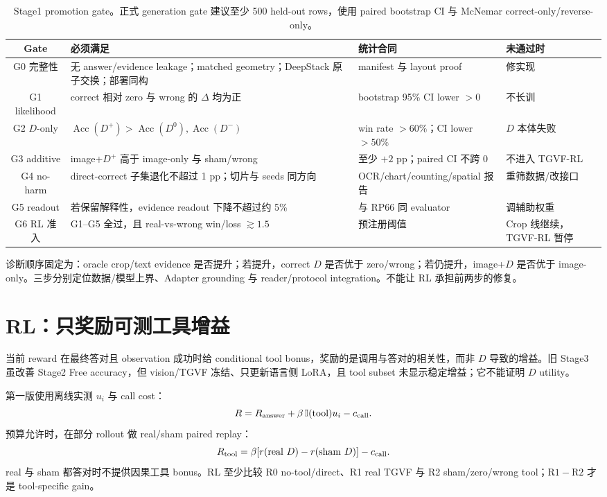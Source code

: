 \documentclass[UTF8,twocolumn,10pt,a4paper]{ctexart}
\begin{document}
\begin{table}[t]
\centering
\caption{Stage1 promotion gate。正式 generation gate 建议至少 500 held-out rows，使用 paired bootstrap CI 与 McNemar correct-only/reverse-only。}
\label{tab:promotion}
\small
\begin{tabularx}{0.97\textwidth}{cYYl}
\toprule
Gate & 必须满足 & 统计合同 & 未通过时 \\
\midrule
G0 完整性 & 无 answer/evidence leakage；matched geometry；DeepStack 原子交换；部署同构 & manifest 与 layout proof & 修实现 \\
G1 likelihood & correct 相对 zero 与 wrong 的 $\Delta$ 均为正 & bootstrap 95\% CI lower $>0$ & 不长训 \\
G2 $D$-only & $\operatorname{Acc}(D^+)>\operatorname{Acc}(D^0),\operatorname{Acc}(D^-)$ & win rate $>60\%$；CI lower $>50\%$ & $D$ 本体失败 \\
G3 additive & image+$D^+$ 高于 image-only 与 sham/wrong & 至少 $+2$ pp；paired CI 不跨 0 & 不进入 TGVF-RL \\
G4 no-harm & direct-correct 子集退化不超过 1 pp；切片与 seeds 同方向 & OCR/chart/counting/spatial 报告 & 重筛数据/改接口 \\
G5 readout & 若保留解释性，evidence readout 下降不超过约 5\% & 与 RP66 同 evaluator & 调辅助权重 \\
G6 RL 准入 & G1--G5 全过，且 real-vs-wrong win/loss $\gtrsim1.5$ & 预注册阈值 & Crop 线继续，TGVF-RL 暂停 \\
\bottomrule
\end{tabularx}
\end{table}

诊断顺序固定为：oracle crop/text evidence 是否提升；若提升，correct $D$ 是否优于 zero/wrong；若仍提升，image+$D$ 是否优于 image-only。三步分别定位数据/模型上界、Adapter grounding 与 reader/protocol integration。不能让 RL 承担前两步的修复。

\section{RL：只奖励可测工具增益}

当前 reward 在最终答对且 observation 成功时给 conditional tool bonus，奖励的是调用与答对的相关性，而非 $D$ 导致的增益。旧 Stage3 虽改善 Stage2 Free accuracy，但 vision/TGVF 冻结、只更新语言侧 LoRA，且 tool subset 未显示稳定增益；它不能证明 $D$ utility。

第一版使用离线实测 $u_i$ 与 call cost：
\begin{equation}
 R=R_{\rm answer}+\beta\,\mathbb I(\mathrm{tool})u_i-c_{\rm call}.
 \label{eq:rl-cheap}
\end{equation}
预算允许时，在部分 rollout 做 real/sham paired replay：
\begin{equation}
 R_{\rm tool}=\beta[r(\mathrm{real}\ D)-r(\mathrm{sham}\ D)]-c_{\rm call}.
 \label{eq:rl-paired}
\end{equation}
real 与 sham 都答对时不提供因果工具 bonus。RL 至少比较 R0 no-tool/direct、R1 real TGVF 与 R2 sham/zero/wrong tool；$\mathrm{R1}-\mathrm{R2}$ 才是 tool-specific gain。
\end{document}

